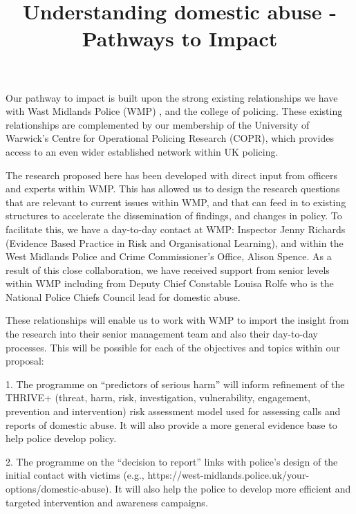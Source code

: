 \documentclass[11pt, a4paper]{article}
\begin{document}
\title{Understanding domestic abuse - Pathways to Impact}
\date{}
\maketitle


Our pathway to impact is built upon the strong existing relationships we have with Wast Midlands Police (WMP) , and the college of policing. These existing relationships are complemented by our membership of the University of Warwick's Centre for Operational Policing Research (COPR), which provides access to an even wider established network within UK policing. 

The research proposed here has been developed with direct input from officers and experts within WMP. This has allowed us to design the research questions that are relevant to current issues within WMP, and that can feed in to existing structures to accelerate the dissemination of findings, and changes in policy. To facilitate this, we have a day-to-day contact at WMP: Inspector Jenny Richards (Evidence Based Practice in Risk and Organisational Learning), and within the West Midlands Police and Crime Commissioner's Office, Alison Spence. As a result of this close collaboration, we have received support from senior levels within WMP including from Deputy Chief Constable Louisa Rolfe who is the National Police Chiefs Council lead for domestic abuse.

These relationships will enable us to work with WMP to import the insight from the research into their senior management team and also their day-to-day processes. This will be possible for each of the objectives and topics within our proposal: 

1. The programme on ``predictors of serious harm'' will inform refinement of the THRIVE+ (threat, harm, risk, investigation, vulnerability, engagement, prevention and intervention) risk assessment model used for assessing calls and reports of domestic abuse. It will also provide a more general evidence base to help police develop policy.

2. The programme on the  ``decision to report'' links with police's design of the initial contact with victims (e.g., https://west-midlands.police.uk/your-options/domestic-abuse). It will also help the police to develop more efficient and targeted intervention and awareness campaigns.
\end{document}
